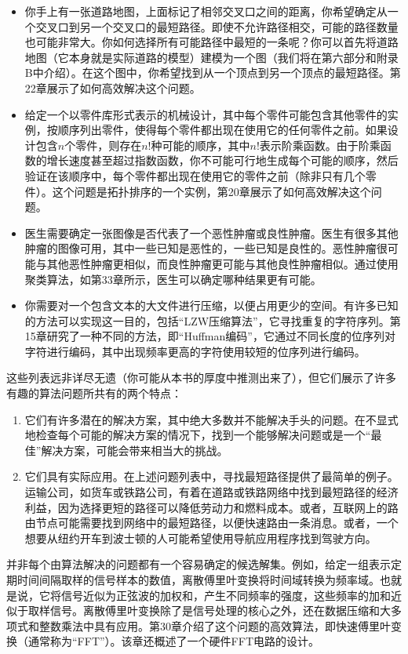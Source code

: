 \documentclass[lang=cn,newtx,10pt,scheme=chinese]{elegantbook}
\begin{document}
\begin{itemize}
    \item 你手上有一张道路地图，上面标记了相邻交叉口之间的距离，你希望确定从一个交叉口到另一个交叉口的最短路径。即使不允许路径相交，可能的路径数量也可能非常大。你如何选择所有可能路径中最短的一条呢？你可以首先将道路地图（它本身就是实际道路的模型）建模为一个图（我们将在第六部分和附录B中介绍）。在这个图中，你希望找到从一个顶点到另一个顶点的最短路径。第22章展示了如何高效解决这个问题。
    \item 给定一个以零件库形式表示的机械设计，其中每个零件可能包含其他零件的实例，按顺序列出零件，使得每个零件都出现在使用它的任何零件之前。如果设计包含$n$个零件，则存在$n!$种可能的顺序，其中$n!$表示阶乘函数。由于阶乘函数的增长速度甚至超过指数函数，你不可能可行地生成每个可能的顺序，然后验证在该顺序中，每个零件都出现在使用它的零件之前（除非只有几个零件）。这个问题是拓扑排序的一个实例，第20章展示了如何高效解决这个问题。
    \item 医生需要确定一张图像是否代表了一个恶性肿瘤或良性肿瘤。医生有很多其他肿瘤的图像可用，其中一些已知是恶性的，一些已知是良性的。恶性肿瘤很可能与其他恶性肿瘤更相似，而良性肿瘤更可能与其他良性肿瘤相似。通过使用聚类算法，如第33章所示，医生可以确定哪种结果更有可能。
    \item 你需要对一个包含文本的大文件进行压缩，以便占用更少的空间。有许多已知的方法可以实现这一目的，包括``LZW压缩算法''，它寻找重复的字符序列。第15章研究了一种不同的方法，即``Huffman编码''，它通过不同长度的位序列对字符进行编码，其中出现频率更高的字符使用较短的位序列进行编码。
\end{itemize}

这些列表远非详尽无遗（你可能从本书的厚度中推测出来了），但它们展示了许多有趣的算法问题所共有的两个特点：

\begin{enumerate}
    \item 它们有许多潜在的解决方案，其中绝大多数并不能解决手头的问题。在不显式地检查每个可能的解决方案的情况下，找到一个能够解决问题或是一个``最佳''解决方案，可能会带来相当大的挑战。
    \item 它们具有实际应用。在上述问题列表中，寻找最短路径提供了最简单的例子。运输公司，如货车或铁路公司，有着在道路或铁路网络中找到最短路径的经济利益，因为选择更短的路径可以降低劳动力和燃料成本。或者，互联网上的路由节点可能需要找到网络中的最短路径，以便快速路由一条消息。或者，一个想要从纽约开车到波士顿的人可能希望使用导航应用程序找到驾驶方向。
\end{enumerate}

并非每个由算法解决的问题都有一个容易确定的候选解集。例如，给定一组表示定期时间间隔取样的信号样本的数值，离散傅里叶变换将时间域转换为频率域。也就是说，它将信号近似为正弦波的加权和，产生不同频率的强度，这些频率的加和近似于取样信号。离散傅里叶变换除了是信号处理的核心之外，还在数据压缩和大多项式和整数乘法中具有应用。第30章介绍了这个问题的高效算法，即快速傅里叶变换（通常称为``FFT''）。该章还概述了一个硬件FFT电路的设计。
\end{document}
